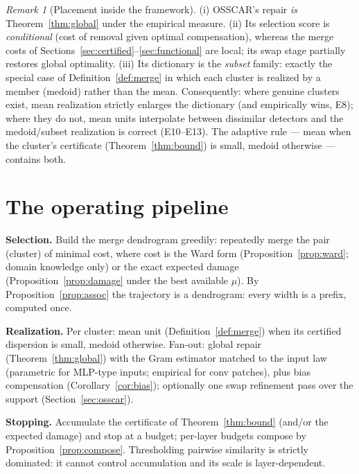 \documentclass[11pt]{article}
\theoremstyle{remark}
\newtheorem{remark}[theorem]{Remark}
\begin{document}
\begin{remark}[Placement inside the framework]\label{rem:placement}
(i) OSSCAR's repair \emph{is} Theorem~\ref{thm:global} under the empirical
measure. (ii) Its selection score is \emph{conditional} (cost of removal
given optimal compensation), whereas the merge costs of
Sections~\ref{sec:certified}--\ref{sec:functional} are local; its swap stage
partially restores global optimality. (iii) Its dictionary is the
\emph{subset} family: exactly the special case of
Definition~\ref{def:merge} in which each cluster is realized by a member
(medoid) rather than the mean. Consequently: where genuine clusters exist,
mean realization strictly enlarges the dictionary (and empirically wins,
E8); where they do not, mean units interpolate between dissimilar detectors
and the medoid/subset realization is correct (E10--E13). The adaptive rule
--- mean when the cluster's certificate (Theorem~\ref{thm:bound}) is small,
medoid otherwise --- contains both.
\end{remark}

\section{The operating pipeline}\label{sec:pipeline}

\textbf{Selection.} Build the merge dendrogram greedily: repeatedly merge
the pair (cluster) of minimal cost, where cost is the Ward form
(Proposition~\ref{prop:ward}; domain knowledge only) or the exact expected
damage (Proposition~\ref{prop:damage} under the best available $\mu$). By
Proposition~\ref{prop:assoc} the trajectory is a dendrogram: every width is
a prefix, computed once.

\textbf{Realization.} Per cluster: mean unit (Definition~\ref{def:merge})
when its certified dispersion is small, medoid otherwise. Fan-out: global
repair (Theorem~\ref{thm:global}) with the Gram estimator matched to the
input law (parametric for MLP-type inputs; empirical for conv patches),
plus bias compensation (Corollary~\ref{cor:bias}); optionally one swap
refinement pass over the support (Section~\ref{sec:osscar}).

\textbf{Stopping.} Accumulate the certificate of Theorem~\ref{thm:bound}
(and/or the expected damage) and stop at a budget; per-layer budgets compose
by Proposition~\ref{prop:compose}. Thresholding pairwise similarity is
strictly dominated: it cannot control accumulation and its scale is
layer-dependent.
\end{document}
